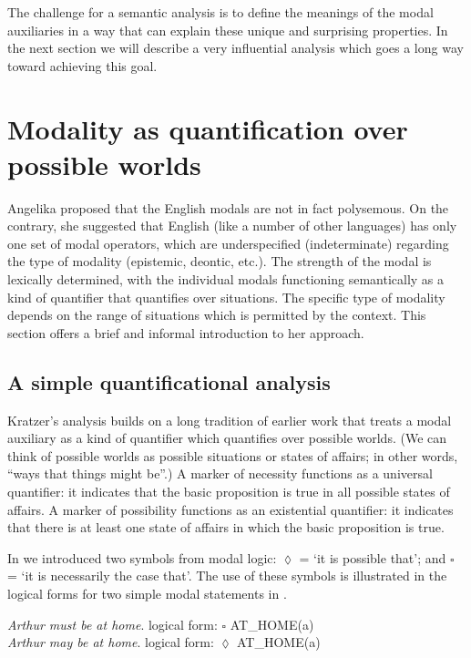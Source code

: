 The challenge for a semantic analysis is to define the meanings of the modal auxiliaries in a way that can explain these unique and surprising properties. In the next section we will describe a very influential analysis which goes a long way toward achieving this goal.


\section{Modality as quantification over possible worlds}\label{sec:16.3}

Angelika \citet{Kratzer1981,Kratzer1991} proposed that the English modals are not in fact polysemous. On the contrary, she suggested that English (like a number of other languages) has only one set of modal operators, which are underspecified (indeterminate) regarding the type of modality (epistemic, deontic, etc.). The strength of the modal is lexically determined, with the individual modals functioning semantically as a kind of quantifier that quantifies over situations. The specific type of modality depends on the range of situations which is permitted by the context. This section offers a brief and informal introduction to her approach.


\subsection{A simple quantificational analysis}\label{sec:16.3.1}

Kratzer’s analysis builds on a long tradition of earlier work that treats a modal auxiliary as a kind of quantifier which quantifies over possible worlds. (We can think of possible worlds as possible situations or states of affairs; in other words, “ways that things might be”.) A marker of necessity functions as a universal quantifier: it indicates that the basic proposition is true in all possible states of affairs. A marker of possibility functions as an existential quantifier: it indicates that there is at least one state of affairs in which the basic proposition is true.



In  we introduced two symbols from modal logic: ${\lozenge}$ = ‘it is possible that’; and ${\square}$ = ‘it is necessarily the case that’. The use of these symbols is illustrated in the logical forms for two simple modal statements in .


\ea \label{ex:16.11}
\ea  \textit{Arthur must be at home}. \hfill logical form: ${\square}$ AT\_HOME(a)\\
\ex \textit{Arthur may be at home}.                 \hfill logical form: ${\lozenge}$ AT\_HOME(a)
                       \z
\z


